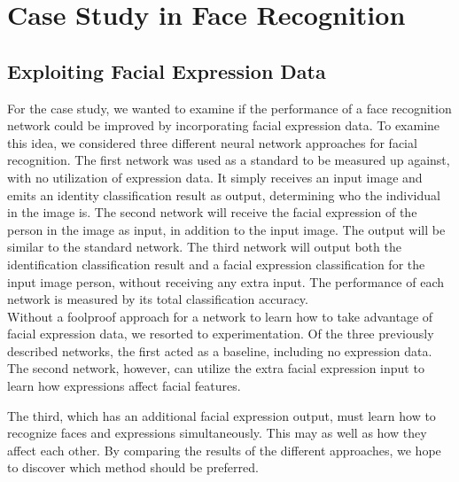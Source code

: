 

\section{Case Study in Face Recognition}



\subsection{Exploiting Facial Expression Data}

For the case study, we wanted to examine if the performance of a face recognition network could be improved by incorporating facial expression data. To examine this idea, we considered three different neural network approaches for facial recognition. The first network was used as a standard to be measured up against, with no utilization of expression data. It simply receives an input image and emits an identity classification result as output, determining who the individual in the image is. The second network will receive the facial expression of the person in the image as input, in addition to the input image. The output will be similar to the standard network. The third network will output both the identification classification result and a facial expression classification for the input image person, without receiving any extra input. The performance of each network is measured by its total classification accuracy. \\

\noindent Without a foolproof approach for a network to learn how to take advantage of facial expression data, we resorted to experimentation. Of the three previously described networks, the first acted as a baseline, including no expression data. The second network, however, can utilize the extra facial expression input to learn how expressions affect facial features.

The third, which has an additional facial expression output, must learn how to recognize faces and expressions simultaneously. This may  as well as how they affect each other. By comparing the results of the different approaches, we hope to discover which method should be preferred. 



